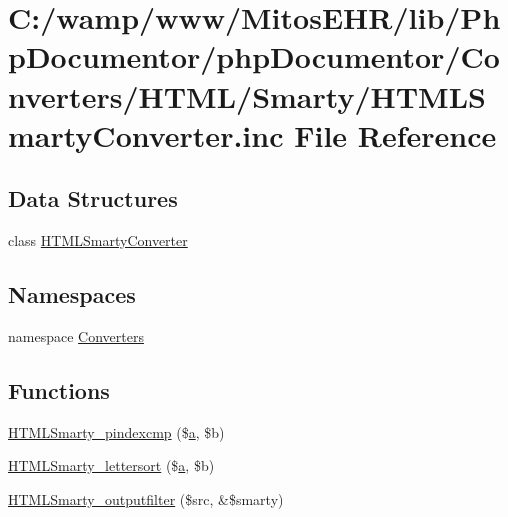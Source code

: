 \hypertarget{_h_t_m_l_smarty_converter_8inc}{\section{\-C\-:/wamp/www/\-Mitos\-E\-H\-R/lib/\-Php\-Documentor/php\-Documentor/\-Converters/\-H\-T\-M\-L/\-Smarty/\-H\-T\-M\-L\-Smarty\-Converter.inc \-File \-Reference}
\label{_h_t_m_l_smarty_converter_8inc}
}
\subsection*{\-Data \-Structures}
\begin{DoxyCompactItemize}
\item 
class \hyperlink{class_h_t_m_l_smarty_converter}{\-H\-T\-M\-L\-Smarty\-Converter}
\end{DoxyCompactItemize}
\subsection*{\-Namespaces}
\begin{DoxyCompactItemize}
\item 
namespace \hyperlink{namespace_converters}{\-Converters}
\end{DoxyCompactItemize}
\subsection*{\-Functions}
\begin{DoxyCompactItemize}
\item 
\hyperlink{_h_t_m_l_smarty_converter_8inc_aacdb38adaa8866069e85a5252a813475}{\-H\-T\-M\-L\-Smarty\-\_\-pindexcmp} (\$\hyperlink{classa}{a}, \$b)
\item 
\hyperlink{_h_t_m_l_smarty_converter_8inc_a8a2f34811036d7d8e4015164474f34a1}{\-H\-T\-M\-L\-Smarty\-\_\-lettersort} (\$\hyperlink{classa}{a}, \$b)
\item 
\hyperlink{_h_t_m_l_smarty_converter_8inc_a5fa3201c6e60b97ae6758a214931a6f6}{\-H\-T\-M\-L\-Smarty\-\_\-outputfilter} (\$src, \&\$smarty)
\end{DoxyCompactItemize}



